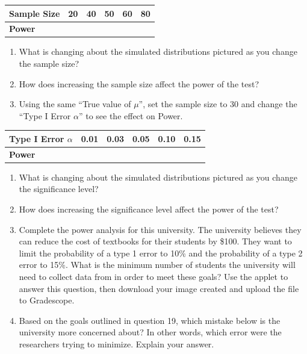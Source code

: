 \documentclass[
]{report}
\begin{document}
\setlength\tabcolsep{0.6cm}
\begin{longtable}{|l|c|c|c|c|c|}
\hline
\textbf{Sample Size}& 20 & 40 & 50 & 60 & 80 \\ \hline
\textbf{Power} & & & & &  \\ \hline
\end{longtable}

\begin{enumerate}
\def\labelenumi{\arabic{enumi}.}
\setcounter{enumi}{13}
\item
  What is changing about the simulated distributions pictured as you change the sample size?
  \vspace{0.5in}
\item
  How does increasing the sample size affect the power of the test?
  \vspace{0.5in}
\item
  Using the same ``True value of \(\mu\)'', set the sample size to 30 and change the ``Type I Error \(\alpha\)'' to see the effect on Power.
\end{enumerate}

\setlength\tabcolsep{0.5cm}
\begin{longtable}{|l|c|c|c|c|c|}
\hline
\textbf{Type I Error $\alpha$}& 0.01 & 0.03 & 0.05 & 0.10 & 0.15 \\ \hline
\textbf{Power} & & & & &  \\ \hline
\end{longtable}

\begin{enumerate}
\def\labelenumi{\arabic{enumi}.}
\setcounter{enumi}{16}
\item
  What is changing about the simulated distributions pictured as you change the significance level?
  \vspace{0.5in}
\item
  How does increasing the significance level affect the power of the test?
  \vspace{0.5in}
\item
  Complete the power analysis for this university. The university believes they can reduce the cost of textbooks for their students by \$100. They want to limit the probability of a type 1 error to 10\% and the probability of a type 2 error to 15\%. What is the minimum number of students the university will need to collect data from in order to meet these goals? Use the applet to answer this question, then download your image created and upload the file to Gradescope.
  \vspace{0.4in}
\item
  Based on the goals outlined in question 19, which mistake below is the university more concerned about? In other words, which error were the researchers trying to minimize. Explain your answer.
\end{enumerate}
\end{document}
